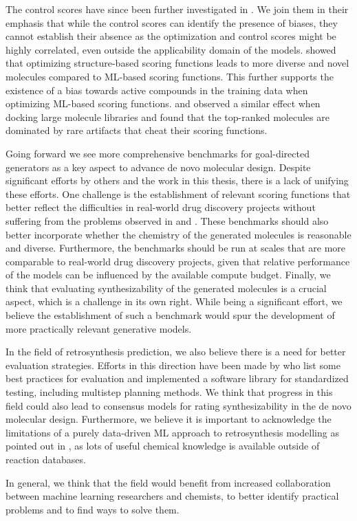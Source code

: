 The control scores have since been further investigated in \citep{turkMolecularAssaysSimulator2022}.
We join them in their emphasis that while the control scores can identify the presence of biases,
they cannot establish their absence as the optimization and control scores might be highly
correlated, even outside the applicability domain of the models.
\citet{thomasComparisonStructureLigandbased2021} showed that optimizing structure-based scoring
functions leads to more diverse and novel molecules compared to \ac{ML}-based scoring functions.
This further supports the existence of a bias towards active compounds in the training data when
optimizing \ac{ML}-based scoring functions. \citet{lyuModelingExpansionVirtual2023} and
\citet{wuIdentifyingArtifactsLarge2024} observed a similar effect when docking large molecule libraries
and found that the top-ranked molecules are dominated by rare artifacts that cheat their scoring
functions.

Going forward we see more comprehensive benchmarks for goal-directed generators as a key aspect to
advance de novo molecular design. Despite significant efforts by others
\citep{brownGuacaMolBenchmarkingModels2019,gaoSampleEfficiencyMatters2022,gaoSynthesizabilityMoleculesProposed2020,thomasMolScoreScoringEvaluation2024}
and the work in this thesis, there is a lack of unifying these efforts. One challenge is the
establishment of relevant scoring functions that better reflect the difficulties in real-world drug
discovery projects \citep{fromerComputeraidedMultiobjectiveOptimization2023} without suffering from
the problems observed in  and \citep{lyuModelingExpansionVirtual2023,wuIdentifyingArtifactsLarge2024}. These
benchmarks should also better incorporate whether the chemistry of the generated molecules is
reasonable \citep{thomasReevaluatingSampleEfficiency2022} and diverse. Furthermore, the benchmarks
should be run at scales that are more comparable to real-world drug discovery projects, given that
relative performance of the models can be influenced by the available compute budget. Finally, we
think that evaluating synthesizability of the generated molecules is a crucial aspect, which is a
challenge in its own right. While being a significant effort, we believe the establishment of such a
benchmark would spur the development of more practically relevant generative models.

In the field of retrosynthesis prediction, we also believe there is a need for better evaluation
strategies. Efforts in this direction have been made by
\citet{maziarzReevaluatingRetrosynthesisAlgorithms2024a} who list some best practices for evaluation
and implemented a software library for standardized testing, including multistep planning
methods. We think that progress in this field could also lead to consensus models for rating
synthesizability in the de novo molecular design. Furthermore, we believe it is important to
acknowledge the limitations of a purely data-driven ML approach to retrosynthesis modelling as
pointed out in \citep{strieth-kalthoffArtificialIntelligenceRetrosynthetic2024}, as lots of useful
chemical knowledge is available outside of reaction databases.

In general, we think that the field would benefit from increased collaboration between machine
learning researchers and chemists, to better identify practical problems
\citep{benderArtificialIntelligenceDrug2021} and to find ways to solve them.


